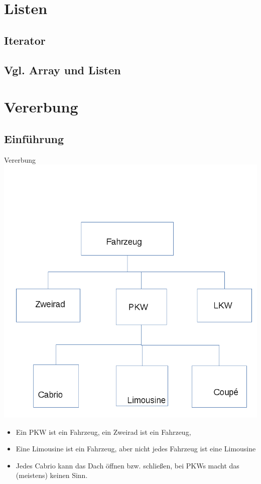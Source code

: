\documentclass[18pt]{beamer}
\begin{document}
\section{Listen}

\subsection{Iterator}

\subsection{Vgl. Array und Listen}



\section{Vererbung}
\subsection{Einführung}
\begin{frame}{Vererbung}
 \includegraphics[scale=0.25]{Fahrzeuge.png}
 \begin{itemize}
 \item Ein PKW ist ein Fahrzeug, ein Zweirad ist ein Fahrzeug, 
  \item Eine Limousine ist ein Fahrzeug, aber nicht jedes Fahrzeug ist eine Limousine
  \item Jedes Cabrio kann das Dach öffnen bzw. schließen, bei PKWs macht das (meistens) keinen Sinn.
 \end{itemize}
\end{frame}
\end{document}
